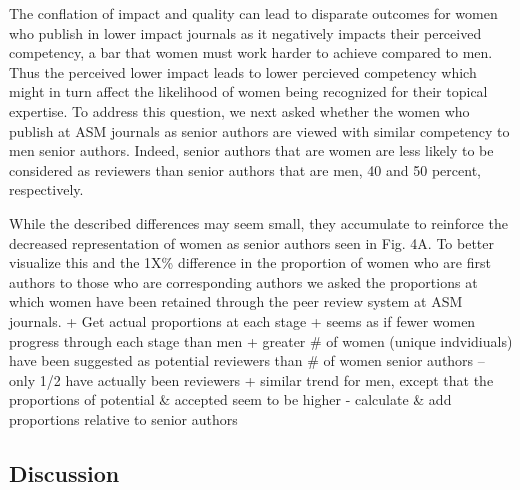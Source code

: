 \documentclass[11pt,]{article}
\begin{document}
The conflation of impact and quality can lead to disparate outcomes for
women who publish in lower impact journals as it negatively impacts
their perceived competency, a bar that women must work harder to achieve
compared to men. Thus the perceived lower impact leads to lower
percieved competency which might in turn affect the likelihood of women
being recognized for their topical expertise. To address this question,
we next asked whether the women who publish at ASM journals as senior
authors are viewed with similar competency to men senior authors.
Indeed, senior authors that are women are less likely to be considered
as reviewers than senior authors that are men, 40 and 50 percent,
respectively.

While the described differences may seem small, they accumulate to
reinforce the decreased representation of women as senior authors seen
in Fig. 4A. To better visualize this and the 1X\% difference in the
proportion of women who are first authors to those who are corresponding
authors we asked the proportions at which women have been retained
through the peer review system at ASM journals. + Get actual proportions
at each stage + seems as if fewer women progress through each stage than
men + greater \# of women (unique indvidiuals) have been suggested as
potential reviewers than \# of women senior authors -- only 1/2 have
actually been reviewers + similar trend for men, except that the
proportions of potential \& accepted seem to be higher - calculate \&
add proportions relative to senior authors

\subsection{Discussion}\label{discussion}
\end{document}
